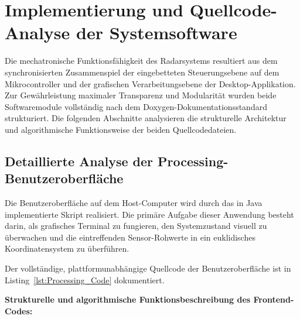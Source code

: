 \section{Implementierung und Quellcode-Analyse der Systemsoftware}
\label{sec:Software_Quellcode_Analyse}

Die mechatronische Funktionsfähigkeit des Radarsystems resultiert aus dem synchronisierten Zusammenspiel der eingebetteten Steuerungsebene auf dem Mikrocontroller und der grafischen Verarbeitungsebene der Desktop-Applikation. Zur Gewährleistung maximaler Transparenz und Modularität wurden beide Softwaremodule vollständig nach dem Doxygen-Dokumentationsstandard strukturiert. Die folgenden Abschnitte analysieren die strukturelle Architektur und algorithmische Funktionsweise der beiden Quellcodedateien.

\subsection{Detaillierte Analyse der Processing-Benutzeroberfläche}
\label{sec:Analyse_Processing_Code}

Die Benutzeroberfläche auf dem Host-Computer wird durch das in Java implementierte Skript realisiert. Die primäre Aufgabe dieser Anwendung besteht darin, als grafisches Terminal zu fungieren, den Systemzustand visuell zu überwachen und die eintreffenden Sensor-Rohwerte in ein euklidisches Koordinatensystem zu überführen.

Der vollständige, plattformunabhängige Quellcode der Benutzeroberfläche ist in Listing~\ref{lst:Processing_Code} dokumentiert.

\begin{center}
	\label{code:UltraschallradarProcessing}  
\end{center}


\bigskip
\noindent
\textbf{Strukturelle und algorithmische Funktionsbeschreibung des Frontend-Codes:}

